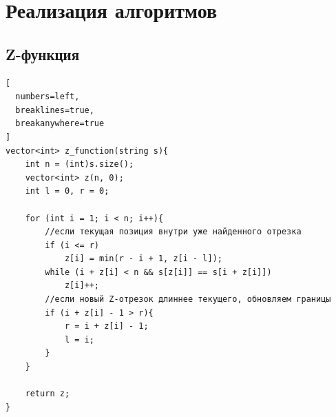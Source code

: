 \documentclass[otchet]{SCWorks}
\begin{document}

\date{2026}

\maketitle

\secNumbering

\tableofcontents




\section{Реализация алгоритмов}
\subsection{Z-функция}
\begin{Verbatim}[
  numbers=left,
  breaklines=true,
  breakanywhere=true
]
vector<int> z_function(string s){
    int n = (int)s.size();
    vector<int> z(n, 0);
    int l = 0, r = 0;

    for (int i = 1; i < n; i++){
        //если текущая позиция внутри уже найденного отрезка
        if (i <= r)
            z[i] = min(r - i + 1, z[i - l]);
        while (i + z[i] < n && s[z[i]] == s[i + z[i]])
            z[i]++;
        //если новый Z-отрезок длиннее текущего, обновляем границы
        if (i + z[i] - 1 > r){
            r = i + z[i] - 1;
            l = i;
        }
    }

    return z;
}
\end{Verbatim}
\end{document}
